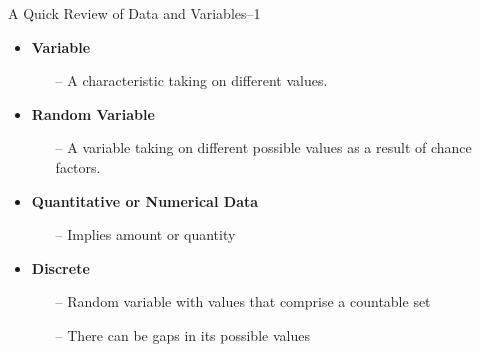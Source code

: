 \documentclass[10pt,dvipsnames, aspectratio=169]{beamer}
\begin{document}
\begin{frame}[t]{A Quick Review of Data and Variables--1}
	\begin{itemize}
		\item \textbf{Variable}
		\begin{itemize}
			\item[--]  A characteristic taking on different values. 
		\end{itemize}
	\end{itemize}
	
	\begin{itemize}
		\item \textbf{Random Variable}
		\begin{itemize}
			\item[--] A variable taking on different possible values as a 
			result of chance factors. 
		\end{itemize}
	\end{itemize}
	
	\begin{itemize}
		\item \textbf{Quantitative or Numerical Data}
		\begin{itemize}
			\item[--] Implies amount or quantity
		\end{itemize}
	\end{itemize}
	
	\begin{itemize}
		\item \textbf{Discrete}
		\begin{itemize}
			\item[--] Random variable with values that comprise a countable
			set
			\item [--]  There can be gaps in its possible values
		\end{itemize}
	\end{itemize}	
\end{frame}
\end{document}
